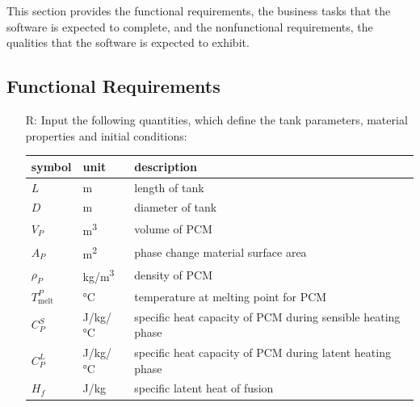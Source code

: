 \documentclass[12pt]{article}
\newcounter{reqnum} %
\begin{document}
This section provides the functional requirements, the business tasks that the
software is expected to complete, and the nonfunctional requirements, the
qualities that the software is expected to exhibit.

\subsection{Functional Requirements}

\noindent \begin{itemize}

\item[R\refstepcounter{reqnum}\thereqnum \label{R_RawInputs}:] Input the following
  quantities, which define the tank parameters, material properties and initial
  conditions:

  \renewcommand{\arraystretch}{1.2}
  \noindent \begin{longtable*}{l l p{12cm}} \toprule
              \textbf{symbol} & \textbf{unit} & \textbf{description}\\
              \midrule 
              $L$ & \si{\metre} & length of tank\\
              $D$ & \si{\metre} & diameter of tank\\
              $V_P$ & \si[per-mode=symbol] {\cubic\metre} & volume of PCM\\
              $A_P$ & \si[per-mode=symbol] {\square\metre} & phase change material surface area\\  
              $\rho_P$ & \si[per-mode=symbol] {\kilogram\per\cubic\metre} & density of PCM\\
              $T_\text{melt}^{P}$ & \si[per-mode=symbol] {\celsius} & temperature at melting
                                                          point for PCM\\
              $C^S_P$ & \si[per-mode=symbol] {\joule\per \kilogram\per \celsius} & specific
                                                          heat capacity of PCM during sensible heating phase\\
              $C^L_P$ & \si[per-mode=symbol] {\joule\per \kilogram\per \celsius} & specific
                                                          heat capacity of PCM during latent heating phase\\
              $H_f$ & \si[per-mode=symbol] {\joule \per \kilogram} & specific latent heat of
                                                          fusion\\

\end{longtable*}
\end{itemize}
\end{document}
